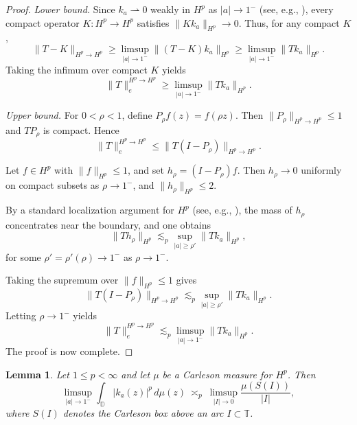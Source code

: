 \documentclass[preprint,12pt]{elsarticle}
\numberwithin{equation}{section}
\newtheorem{lemma}{Lemma}[section]
\theoremstyle{remark}
\begin{document}
\begin{proof}
\textit{Lower bound.}
Since $k_a\rightharpoonup 0$ weakly in $H^p$ as $|a|\to1^-$ (see, e.g., \cite[Ch.~2]{Garnett-book}),
every compact operator $K:H^p\to H^p$ satisfies $\|Kk_a\|_{H^p}\to 0$.
Thus, for any compact $K$,
\begin{equation*}
\|T-K\|_{H^p\to H^p}
\ge \limsup_{|a|\to1^-}\|(T-K)k_a\|_{H^p}
\ge \limsup_{|a|\to1^-}\|Tk_a\|_{H^p}.
\end{equation*}
Taking the infimum over compact $K$ yields
\begin{equation*}
\|T\|_e^{H^p\to H^p} \ge \limsup_{|a|\to1^-}\|Tk_a\|_{H^p}.
\end{equation*}

\medskip
\noindent\textit{Upper bound.}
For $0<\rho<1$, define $P_\rho f(z)=f(\rho z)$. Then $\|P_\rho\|_{H^p\to H^p}\le 1$ and $TP_\rho$ is compact.
Hence
\begin{equation*}
\|T\|_e^{H^p\to H^p} \le \|T(I-P_\rho)\|_{H^p\to H^p}.
\end{equation*}

Let $f\in H^p$ with $\|f\|_{H^p}\le1$, and set $h_\rho=(I-P_\rho)f$.
Then $h_\rho\to 0$ uniformly on compact subsets as $\rho\to1^-$, and $\|h_\rho\|_{H^p}\le 2$.

By a standard localization argument for $H^p$ (see, e.g., \cite[Ch.~2]{Zhu2007}),
the mass of $h_\rho$ concentrates near the boundary, and one obtains
\begin{equation*}
\|Th_\rho\|_{H^p}
\lesssim_p \sup_{|a|\ge \rho'} \|Tk_a\|_{H^p},
\end{equation*}
for some $\rho'=\rho'(\rho)\to1^-$ as $\rho\to1^-$.

Taking the supremum over $\|f\|_{H^p}\le1$ gives
\begin{equation*}
\|T(I-P_\rho)\|_{H^p\to H^p}
\lesssim_p \sup_{|a|\ge \rho'} \|Tk_a\|_{H^p}.
\end{equation*}
Letting $\rho\to1^-$ yields
\begin{equation*}
\|T\|_e^{H^p\to H^p}
\lesssim_p \limsup_{|a|\to1^-}\|Tk_a\|_{H^p}.
\end{equation*}
The proof is now complete.
\end{proof}


\begin{lemma}\label{lem:carleson-density-kernel}
Let $1\le p<\infty$ and let $\mu$ be a Carleson measure for $H^p$. Then
\begin{equation}\label{eq:carleson-density-kernel}
\limsup_{|a|\to 1^-}\int_{\mathbb D}|k_a(z)|^p\,d\mu(z)
\ \asymp_p\
\limsup_{|I|\to 0}\frac{\mu(S(I))}{|I|},
\end{equation}
where $S(I)$ denotes the Carleson box above an arc $I\subset\mathbb T$.
\end{lemma}
\end{document}
